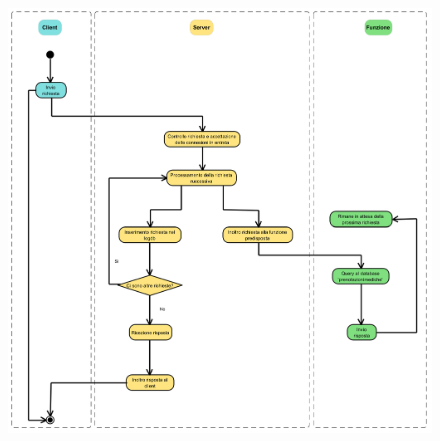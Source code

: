 \documentclass[12pt]{report}
\begin{document}
    \begin{figure}[H]
        \centering
        \includegraphics[width=1\linewidth]{images/Activity diagram.png}
        \label{Activity diagram}
    \end{figure}
    
\end{document}
